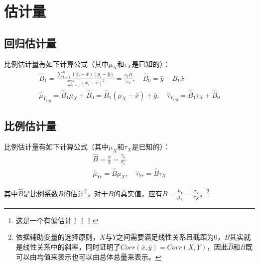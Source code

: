 \section{估计量}

\subsection{回归估计量}
\begin{definition}
	比例估计量有如下计算公式（其中$\mu_X$和$\tau_X$是已知的）：
	\begin{gather*}
		\hat{B}_1=\frac{\sum\limits_{i=1}^n(x_i-\bar{x})(y_i-\bar{y})}{\sum\limits_{i=1}^n(x_i-\bar{x})^2}=\frac{s_y\hat{R}}{s_x},\quad
		\hat{B}_0=\bar{y}-\hat{B}_1\bar{x} \\
		\hat{\mu}_{Y_{reg}}=\hat{B}_1\mu_X+\hat{B}_0=\hat{B}_1(\mu_X-\bar{x})+\bar{y},\quad
		\hat{\tau}_{Y_{reg}}=\hat{B}_1\tau_X+\hat{B}_0
	\end{gather*}
\end{definition}


\subsection{比例估计量}
\begin{definition}
	比例估计量有如下计算公式（其中$\mu_X$和$\tau_X$是已知的）：
	\begin{gather*}
		\hat{B}=\frac{\bar{y}}{\bar{x}}=\frac{\tau_y}{\tau_x} \\
		\hat{\mu}_{Yr}=\hat{B}\mu_X,\quad\hat{\tau}_{Yr}=\hat{B}\tau_X 
	\end{gather*}
\end{definition}
其中$\hat{B}$是比例系数$B$的估计\footnote{这是一个有偏估计！！！}，对于$B$的真实值，应有$B=\frac{\mu_Y}{\mu_X}=\frac{\tau_Y}{\tau_X}$。\footnote{依据辅助变量的选择原则，$X$与$Y$之间需要满足线性关系且截距为$0$，$B$其实就是线性关系中的斜率，同时证明了$Corr(\bar{x},\bar{y})=Corr(X,Y)$，因此$\hat{B}$和$B$既可以由均值来表示也可以由总体总量来表示。}